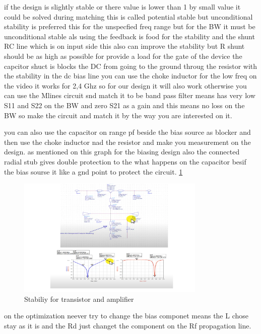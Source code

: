 \documentclass{article}
\begin{document}
\begin{itemize}
    if the design is slightly stable or there  value is lower than 1 by small value it could be solved during matching this is called potential stable but unconditional stability is preferred this for the unspecfied freq range but for the BW it must be unconditional stable 
    als using the feedback is food for the stability and the shunt RC line which is on input side this also can improve the stability 
    but R shunt should be as high as possible for provide a load for the gate of the device the capcitor shuct is blocks the DC from going to the ground throug the resistor 
    with the stability 
    in the dc bias line you can use the choke inductor for the low freq on the video it works for  2,4 Ghz so for our design it will also work otherwise you can use the Mlines circuit snd match it to be band pass filter  means has very low S11 and S22 on the BW and zero S21 as a gain and this means no loss on the BW so make the circuit and match it by the way you are interested on it.
    
    you can also use the capacitor on range pf beside the bias source as blocker and then use the choke inductor nad the resistor and make you measurement on the design.
    as mentioned on this graph for the biasing design also the connected radial stub gives double protection to the what happens on the capacitor besif the bias sourse it like a gnd point to protect the circuit. \cref{Bias0}
    \begin{figure}[H]
        \centering
        \includegraphics[width=0.8\textwidth]{figures/Bias0.pdf}
        \caption{Stabiliy for transistor and amplifier}
        \label{Bias0}
    \end{figure}



    on the optimization neever try to change the bias componet means the  L chose stay as it is and the Rd just changet the component on the Rf propagation line.



\end{itemize}
\end{document}
